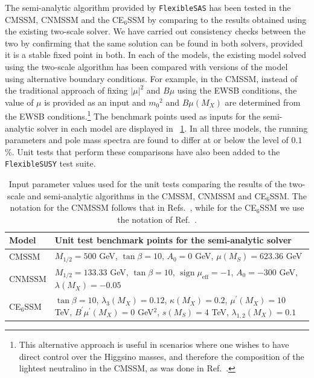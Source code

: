 \documentclass[final,3p,11pt,pdflatex]{elsarticle}
\makeatletter
\newcommand{\fs}{\texttt{FlexibleSUSY}\@\xspace}
\newcommand{\fsas}{\texttt{FlexibleSAS}\@\xspace}
\newcommand{\ESSM}{E$_6$SSM\@\xspace}
\newcommand{\MS}{\ensuremath{M_S}\xspace}
\newcommand{\tabref}[1]{\tablename~\ref{#1}}
\newcommand{\azero}{\ensuremath{A_0}\xspace}
\newcommand{\mhalf}{\ensuremath{M_{1/2}}\xspace}
\newcommand{\mzero}{\ensuremath{m_0}\xspace}
\DeclareMathOperator{\sign}{sign}
\makeatother
\begin{document}
The semi-analytic algorithm provided by \fsas has been tested in the
CMSSM, CNMSSM and the C\ESSM by comparing to the results
obtained using the existing two-scale solver.  We have
carried out consistency checks between the two by confirming that the same
solution can be found in both solvers, provided it is a stable fixed
point in both.  In each of the models, the existing model solved using
the two-scale algorithm has been compared with versions of the model
using alternative boundary conditions.  For example, in the CMSSM,
instead of the traditional approach of fixing $|\mu|^2$ and $B\mu$
using the EWSB conditions, the value of $\mu$ is provided as an input
and $\mzero^2$ and $B\mu(M_X)$ are determined from the EWSB
conditions.\footnote{This alternative approach is useful in scenarios where
  one wishes to have direct control over the Higgsino masses, and therefore
  the composition of the lightest neutralino in the CMSSM, as was done in
  Ref.\ \cite{Athron:2016gor}.}  The benchmark points used as inputs for the
semi-analytic solver in each model are displayed in
\tabref{tab:semi_analytic_bms}.  In all three models, the
running parameters and pole mass spectra are found to differ at or
below the level of $0.1$\%.  Unit tests that perform these
comparisons have also been added to the \fs test suite.
%
\begin{table}[tbh]
  \centering
  \begin{tabularx}{\textwidth}{lX}
    \toprule
    Model & Unit test benchmark points for the semi-analytic solver\\
    \midrule
    CMSSM & $\mhalf = 500$ GeV, $\tan\beta = 10$, $\azero = 0$ GeV,
    $\mu(\MS) = 623.36$ GeV\\
    CNMSSM & $\mhalf = 133.33$ GeV, $\tan\beta = 10$,
    $\sign \mu_{\text{eff}} = -1$, $\azero = -300$ GeV, $\lambda(M_X) =-0.05$\\
    C\ESSM & $\tan\beta = 10$, $\lambda_3(M_X) = 0.12$, $\kappa(M_X) = 0.2$,
    $\mu^\prime(M_X) = 10$ TeV, $B^\prime\mu^\prime(M_X) = 0$ GeV$^2$,
    $s(\MS) = 4$ TeV, $\lambda_{1,2}(M_X) = 0.1$\\
    \bottomrule
  \end{tabularx}
  \caption{Input parameter values used for the unit tests comparing the
    results of the two-scale and semi-analytic algorithms in the CMSSM,
    CNMSSM and C\ESSM.  The notation for the CNMSSM follows that in
    Refs.~\cite{Allanach:2013kza,Ellwanger:2009dp}, while for the
    C\ESSM we use the notation of Ref.~\cite{Athron:2009bs}.}
  \label{tab:semi_analytic_bms}
\end{table}
\end{document}
